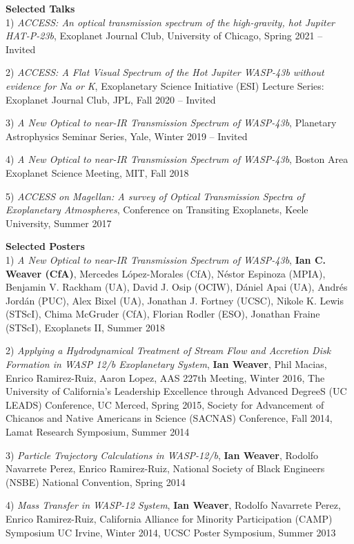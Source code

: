 

\begin{cventries}
\raggedright{
\textbf{Selected Talks}\\
  1) \textit{ACCESS: An optical transmission spectrum of the high-gravity, hot Jupiter HAT-P-23b}, Exoplanet Journal Club, University of Chicago, Spring 2021 -- Invited
  
  2) \textit{ACCESS: A Flat Visual Spectrum of the Hot Jupiter WASP-43b without evidence for Na or K},
  Exoplanetary Science Initiative (ESI) Lecture Series: Exoplanet Journal Club,
  JPL, Fall 2020 -- Invited
  
  3) \textit{A New Optical to near-IR Transmission Spectrum of WASP-43b},
  Planetary Astrophysics Seminar Series,
  Yale, Winter 2019 -- Invited

  4) \textit{A New Optical to near-IR Transmission Spectrum of WASP-43b}, Boston
  Area Exoplanet Science Meeting, MIT, Fall 2018

  5) \textit{ACCESS on Magellan: A survey of Optical Transmission Spectra of
  Exoplanetary Atmospheres}, Conference on Transiting Exoplanets, Keele
  University, Summer 2017

  \textbf{Selected Posters}\\
	  1) \textit{A New Optical to near-IR Transmission Spectrum of WASP-43b},
	  \textbf{Ian C. Weaver (CfA)}, Mercedes L\'opez-Morales (CfA), Néstor
	  Espinoza (MPIA), Benjamin V. Rackham (UA), David J. Osip (OCIW),
	  Dániel Apai (UA), Andrés Jordán (PUC), Alex Bixel (UA), Jonathan J.
	  Fortney (UCSC), Nikole K. Lewis (STScI), Chima McGruder (CfA),
	  Florian Rodler (ESO), Jonathan Fraine (STScI), Exoplanets II, Summer
	  2018

      2) \textit{Applying a Hydrodynamical Treatment of Stream Flow and Accretion Disk Formation in WASP 12/b
      Exoplanetary System}, \textbf{Ian Weaver}, Phil Macias, Enrico Ramirez-Ruiz, Aaron Lopez,
      AAS 227th Meeting, Winter 2016,
      The University of California's Leadership Excellence through Advanced DegreeS (UC LEADS) Conference, UC
      Merced, Spring 2015,
      Society for Advancement of Chicanos and Native Americans in Science
      (SACNAS) Conference, Fall 2014, 
      Lamat Research Symposium, Summer 2014

      3) \textit{Particle Trajectory Calculations in WASP-12/b}, \textbf{Ian Weaver}, Rodolfo Navarrete Perez, Enrico
      Ramirez-Ruiz, National Society of Black Engineers (NSBE) National Convention, Spring 2014
       
      4) \textit{Mass Transfer in WASP-12 System}, \textbf{Ian Weaver}, Rodolfo Navarrete Perez, Enrico
      Ramirez-Ruiz, California Alliance for Minority Participation (CAMP) Symposium UC Irvine, Winter 2014,
      UCSC Poster Symposium, Summer 2013
}
\end{cventries}